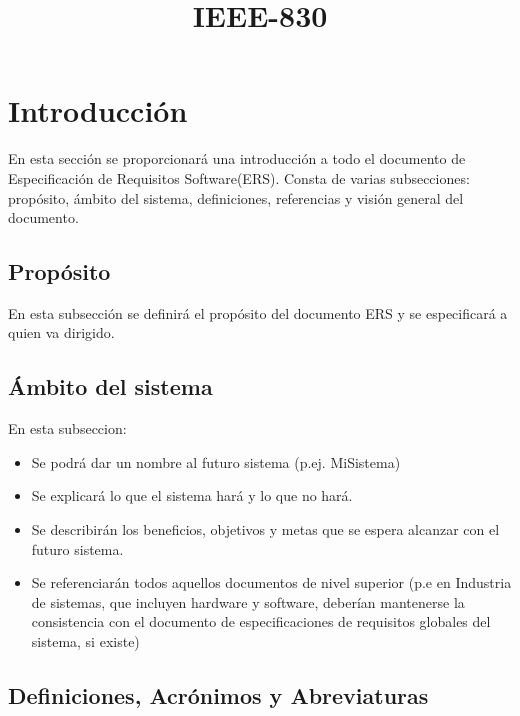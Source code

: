 \documentclass[12pt,a4paper, twosite]{article}
\date{}
\title{IEEE-830}
\begin{document}
\maketitle
\tableofcontents

\newpage

\section{Introducción}
\label{sec:org60390fa}

En esta sección se proporcionará una introducción a todo el
documento de Especificación de Requisitos Software(ERS). Consta de
varias subsecciones: propósito, ámbito del sistema, definiciones,
referencias y visión general del documento.


\subsection{Propósito}
\label{sec:org434c3ef}

En esta subsección se definirá el propósito del documento ERS y se
especificará a quien va dirigido.


\subsection{Ámbito del sistema}
\label{sec:org12e44a1}

En esta subseccion:

\begin{itemize}
\item Se podrá dar un nombre al futuro sistema (p.ej. MiSistema)

\item Se explicará lo que el sistema hará y lo que no hará.

\item Se describirán los beneficios, objetivos y metas que se espera
alcanzar con el futuro sistema.

\item Se referenciarán todos aquellos documentos de nivel superior (p.e en
Industria de sistemas, que incluyen hardware y software, deberían
mantenerse la consistencia con el documento de especificaciones de
requisitos globales del sistema, si existe)
\end{itemize}


\subsection{Definiciones, Acrónimos y Abreviaturas}
\label{sec:orgb158e36}
\end{document}
